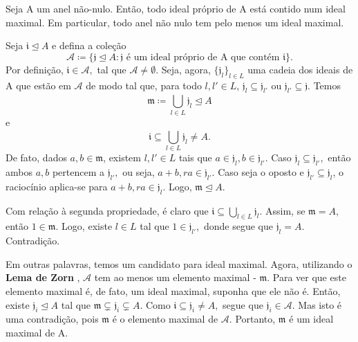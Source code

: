 \documentclass[AlgebraII/algebraII_notes.tex]{subfiles}
\begin{document}
\begin{theorem*}
	Seja A um anel não-nulo. Então, todo ideal próprio de A está contido num ideal maximal. Em particular, todo anel
	não nulo tem pelo menos um ideal maximal.
\end{theorem*}
\begin{proof*}
	Seja \(\mathfrak{i}\trianglelefteq A\) e defina a coleção
	\[
		\mathcal{A} \coloneqq \{\mathfrak{j}\trianglelefteq A: \mathfrak{j} \text{ é um ideal próprio de A que contém }\mathfrak{i}\}.
	\]
	Por definição, \(\mathfrak{i}\in \mathcal{A},\) tal que \(\mathcal{A}\neq\emptyset.\) Seja, agora, \(\{\mathfrak{j}_{l}\}_{l\in L}\) uma cadeia
	dos ideais de A que estão em \(\mathcal{A}\) de modo tal que, para todo \(l, l'\in L\),
	\(\mathfrak{j}_{l}\subseteq \mathfrak{j}_{l'}\) ou \(\mathfrak{j}_{l'}\subseteq \mathfrak{j}\). Temos
	\[
		\mathfrak{m}\coloneqq \bigcup_{l\in L}^{}\mathfrak{j}_{l}\trianglelefteq A
	\]
	e
	\[
		\mathfrak{i}\subseteq \bigcup_{l\in L}^{}\mathfrak{j}_{l}\neq A.
	\]
	De fato, dados \(a, b\in \mathfrak{m}\), existem \(l, l'\in L\) tais que \(a\in \mathfrak{j}_{l}, b\in \mathfrak{j}_{l'}\).
	Caso \(\mathfrak{j}_{l}\subseteq \mathfrak{j}_{l'},\) então ambos \(a, b\) pertencem a \(\mathfrak{j}_{l'},\) ou seja, \(a + b, ra\in \mathfrak{j}_{l'}.\) Caso
	seja o oposto e \(\mathfrak{j}_{l'}\subseteq \mathfrak{j}_{l}\), o raciocínio aplica-se para \(a + b, ra\in \mathfrak{j}_{l}\). Logo, \(\mathfrak{m}\trianglelefteq A.\)

	Com relação à segunda propriedade, é claro que \(\mathfrak{i}\subseteq \bigcup_{l\in L}^{}\mathfrak{j}_{l}.\) Assim, se
	\(\mathfrak{m} = A,\) então \(1\in \mathfrak{m}.\) Logo, existe \(l\in L\) tal que \(1\in \mathfrak{j}_{l'},\) donde segue que
	\(\mathfrak{j}_{l} = A.\) Contradição.

	Em outras palavras, temos um candidato para ideal maximal. Agora, utilizando o \textbf{Lema de Zorn} , \(\mathcal{A}\) tem
	ao menos um elemento maximal - \(\mathfrak{m}\). Para ver que este elemento maximal é, de fato, um ideal maximal, suponha que ele não é. Então, existe \(\mathfrak{j}_{i} \trianglelefteq A\) tal que
	\(\mathfrak{m}\subsetneq \mathfrak{j}_{i} \subsetneq A\). Como \(\mathfrak{i}\subseteq \mathfrak{j}_{i}\neq A,\) segue que \(\mathfrak{j}_{i}\in \mathcal{A}.\) Mas isto é uma contradição,
	pois \(\mathfrak{m}\) é o elemento maximal de \(\mathcal{A}.\) Portanto, \(\mathfrak{m}\) é um ideal maximal de A. \qedsymbol
\end{proof*}
\end{document}
